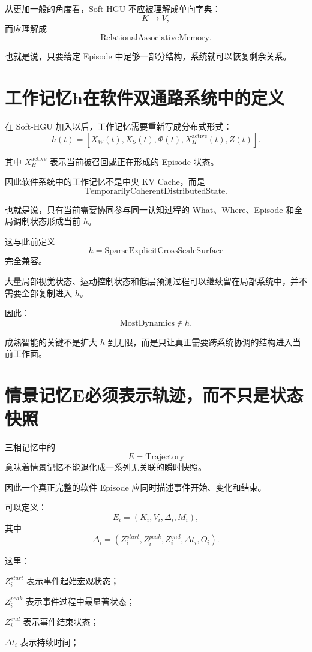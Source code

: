 从更加一般的角度看，Soft-HGU 不应被理解成单向字典：
\[
K\rightarrow V,
\]
而应理解成
\[
\boxed{
\mathrm{RelationalAssociativeMemory}.
}
\]

也就是说，只要给定 Episode 中足够一部分结构，系统就可以恢复剩余关系。

\section{工作记忆h在软件双通路系统中的定义}

在 Soft-HGU 加入以后，工作记忆需要重新写成分布式形式：
\[
\boxed{
h(t)
=
[
X_W(t),
X_S(t),
\Phi(t),
X_H^{\mathrm{active}}(t),
Z(t)
].
}
\]

其中 $X_H^{\mathrm{active}}$ 表示当前被召回或正在形成的 Episode 状态。

因此软件系统中的工作记忆不是中央 KV Cache，而是
\[
\boxed{
\mathrm{TemporarilyCoherentDistributedState}.
}
\]

也就是说，只有当前需要协同参与同一认知过程的 What、Where、Episode 和全局调制状态形成当前 $h$。

这与此前定义
\[
\boxed{
h=\mathrm{SparseExplicitCrossScaleSurface}
}
\]
完全兼容。

大量局部视觉状态、运动控制状态和低层预测过程可以继续留在局部系统中，并不需要全部复制进入 $h$。

因此：
\[
\boxed{
\mathrm{MostDynamics}\notin h.
}
\]

成熟智能的关键不是扩大 $h$ 到无限，而是只让真正需要跨系统协调的结构进入当前工作面。

\section{情景记忆E必须表示轨迹，而不只是状态快照}

三相记忆中的
\[
E=\mathrm{Trajectory}
\]
意味着情景记忆不能退化成一系列无关联的瞬时快照。

因此一个真正完整的软件 Episode 应同时描述事件开始、变化和结束。

可以定义：
\[
E_i
=
(
K_i,
V_i,
\Delta_i,
M_i
),
\]
其中
\[
\Delta_i
=
(
Z_i^{start},
Z_i^{peak},
Z_i^{end},
\Delta t_i,
O_i
).
\]

这里：

$Z_i^{start}$ 表示事件起始宏观状态；

$Z_i^{peak}$ 表示事件过程中最显著状态；

$Z_i^{end}$ 表示事件结束状态；

$\Delta t_i$ 表示持续时间；

